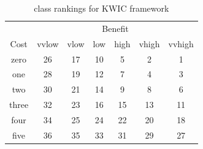 \documentclass[twocolumn]{styles/IEEEtran}
\begin{document}
\newpage
%
 \begin{table}[h]
 \begin{center}
 \begin{small}
 \begin{tabular}[t]{|c|cccccc|} \hline
 & \multicolumn{6}{c|}{Benefit} \\ 
 Cost	& vvlow 	& vlow 	& low 	& high 	& vhigh	& vvhigh \\ \hline
 zero 	& 26 	& 17 	& 10 	& 5 	& 2 	& 1 \\ 
 one 	& 28 	& 19 	& 12 	& 7 	& 4 	& 3 \\ 
 two 	& 30 	& 21	& 14 	& 9 	& 8 	& 6 \\ 
 three 	& 32 	& 23 	& 16 	& 15 	& 13 	& 11 \\ 
 four 	& 34 	& 25 	& 24 	& 22 	& 20 	& 18 \\ 
 five 	& 36 	& 35 	& 33 	& 31 	& 29 	& 27 \\ \hline
 \end{tabular}
 \end{small}
 \end{center}
 \caption{class rankings for KWIC framework}
 \label{tab:arch_def_rigorous_rank1}
 \end{table}

\newpage

\end{document}
